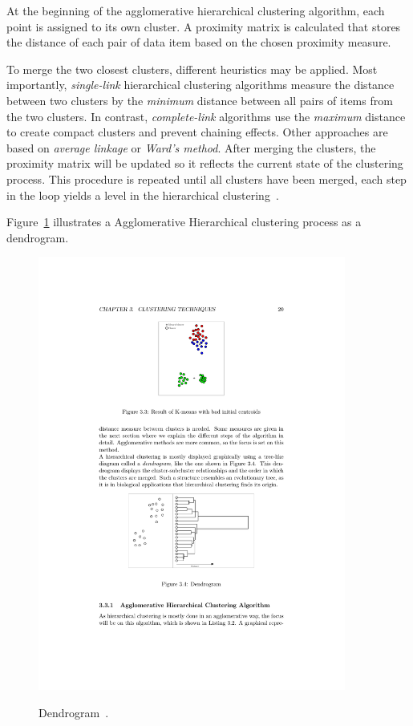 \begin{itemize}
At the beginning of the agglomerative hierarchical clustering algorithm, each point is assigned to its own cluster. A proximity matrix is calculated that stores the distance of each pair of data item based on the chosen proximity measure.

To merge the two closest clusters, different heuristics may be applied. Most importantly, \textit{single-link} hierarchical clustering algorithms measure the distance between two clusters by the \textit{minimum} distance between all pairs of items from the two clusters. In contrast, \textit{complete-link} algorithms use the \textit{maximum} distance to create compact clusters and prevent chaining effects. Other approaches are based on \textit{average linkage} or \textit{Ward's method}. After merging the clusters, the proximity matrix will be updated so it reflects the current state of the clustering process. This procedure is repeated until all clusters have been merged, each step in the loop yields a level in the hierarchical clustering~\cite{Jain88clustering, Jain99clusterreview, Meert06clustermaps}.

Figure~\ref{fig:clustering-hierarchical-dendrogram} illustrates a Agglomerative Hierarchical clustering process as a dendrogram.

\begin{figure}[h]
  \begin{center}
    \includegraphics[width=0.9\textwidth]{figures/clustering_hierarchical_dendrogram.pdf}
    \label{fig:clustering-hierarchical-dendrogram}
    \caption{Dendrogram~\cite[p 20]{Meert06clustermaps}.}
  \end{center}
\end{figure}



\end{itemize}
